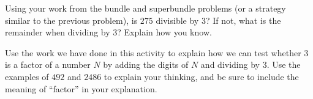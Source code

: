 \documentclass[nooutcomes,noauthor,handout]{ximera}
\begin{document}
\begin{problem}
Using your work from the bundle and superbundle problems (or a strategy similar to the previous problem), is $275$ divisible by $3$? If not, what is the remainder when dividing by $3$? Explain how you know.

\begin{image} \end{image}


\end{problem}



\begin{problem}
Use the work we have done in this activity to explain how we can test whether $3$ is a factor of a number $N$ by adding the digits of $N$ and dividing by $3$. Use the examples of $492$ and $2486$ to explain your thinking, and be sure to include the meaning of ``factor'' in your explanation.
\end{problem}




\newpage
\end{document}
